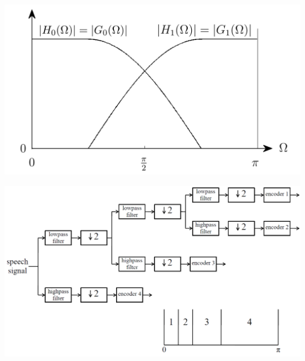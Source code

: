\begin{center}
	\includegraphics[scale=.7]{../fig/power_symetric}
\end{center}
\begin{center}
	\includegraphics[scale=.7]{../fig/quadrature_mirror_ex}
\end{center}

